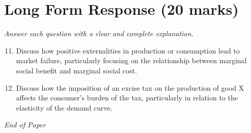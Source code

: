 \documentclass[12pt]{article}
\begin{document}
\section*{Long Form Response (20 marks)}
\textit{Answer each question with a clear and complete explanation.}
\begin{enumerate}[label=\arabic*.]
\setcounter{enumi}{10}
\item Discuss how positive externalities in production or consumption lead to market failure, particularly focusing on the relationship between marginal social benefit and marginal social cost.
\item Discuss how the imposition of an excise tax on the production of good X affects the consumer's burden of the tax, particularly in relation to the elasticity of the demand curve.
\end{enumerate}

\vfill
\noindent\textit{End of Paper}
\end{document}
